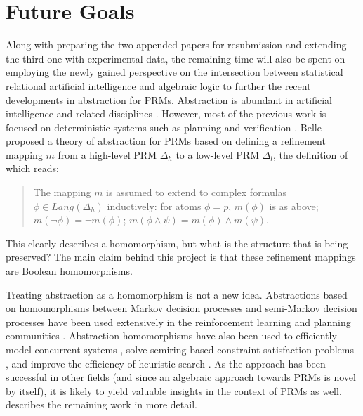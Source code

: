 \documentclass{article}
\begin{document}
\section{Future Goals}

Along with preparing the two appended papers for resubmission and extending the
third one with experimental data, the remaining time will also be spent on
employing the newly gained perspective on the intersection between statistical
relational artificial intelligence and algebraic logic to further the recent
developments in abstraction for PRMs. Abstraction is abundant in artificial
intelligence and related disciplines \cite{saitta2013abstraction}. However, most
of the previous work is focused on deterministic systems such as planning and
verification \cite{DBLP:journals/ai/GiunchigliaW92}. Belle
\cite{DBLP:journals/corr/abs-1810-02434} proposed a theory of abstraction for
PRMs based on defining a refinement mapping $m$ from a high-level PRM $\Delta_h$
to a low-level PRM $\Delta_l$, the definition of which reads:
\begin{quote}
  The mapping $m$ is assumed to extend to complex formulas $\phi \in
  \mathit{Lang}(\Delta_h)$ inductively: for atoms $\phi = p$, $m(\phi)$ is as
  above; $m(\neg\phi) = \neg m(\phi)$; $m(\phi \land \psi) = m(\phi) \land
  m(\psi)$.
\end{quote}
This clearly describes a homomorphism, but what is the structure that is being
preserved? The main claim behind this project is that these refinement mappings
are Boolean homomorphisms.

Treating abstraction as a homomorphism is not a new idea. Abstractions based on
homomorphisms between Markov decision processes and semi-Markov decision
processes have been used extensively in the reinforcement learning and planning
communities
\cite{DBLP:conf/atal/JiangSL14,DBLP:conf/ijcai/RavindranB03,ravindran2004algebraic}.
Abstraction homomorphisms have also been used to efficiently model concurrent
systems \cite{DBLP:journals/jcss/Castellani87,DBLP:journals/topnoc/DeselM10},
solve semiring-based constraint satisfaction problems
\cite{DBLP:journals/tcs/LiY08}, and improve the efficiency of heuristic search
\cite{DBLP:conf/aaai/HoltePZM96}. As the approach has been successful in other
fields (and since an algebraic approach towards PRMs is novel by itself), it is
likely to yield valuable insights in the context of PRMs as well.
 describes the remaining work in more detail.
\end{document}
